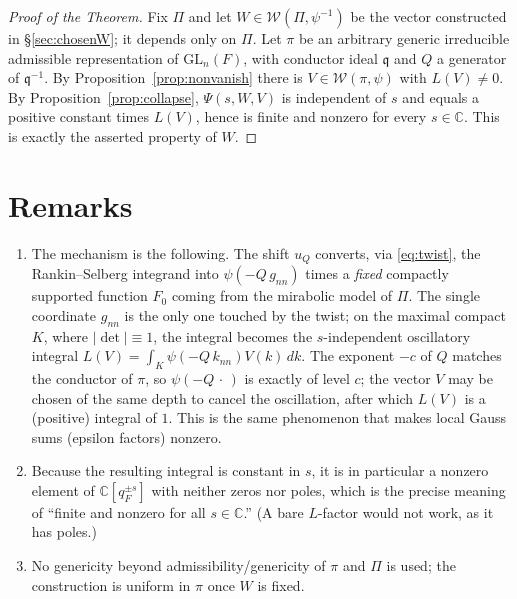 \documentclass[12pt]{article}
\newcommand{\GL}{\mathrm{GL}}
\newcommand{\qq}{\mathfrak{q}}
\newcommand{\Wmod}{\mathcal{W}}
\begin{document}
\begin{proof}[Proof of the Theorem]
Fix $\Pi$ and let $W\in\Wmod(\Pi,\psi^{-1})$ be the vector constructed in
\S\ref{sec:chosenW}; it depends only on $\Pi$. Let $\pi$ be an arbitrary generic
irreducible admissible representation of $\GL_n(F)$, with conductor ideal $\qq$ and
$Q$ a generator of $\qq^{-1}$. By Proposition~\ref{prop:nonvanish} there is
$V\in\Wmod(\pi,\psi)$ with $L(V)\neq0$. By Proposition~\ref{prop:collapse},
$\Psi(s,W,V)$ is independent of $s$ and equals a positive constant times $L(V)$,
hence is finite and nonzero for every $s\in\mathbb C$. This is exactly the asserted
property of $W$.
\end{proof}

\section*{Remarks}

\begin{enumerate}
\item The mechanism is the following. The shift $u_Q$ converts, via
\eqref{eq:twist}, the Rankin--Selberg integrand into $\psi(-Q\,g_{nn})$ times a
\emph{fixed} compactly supported function $F_0$ coming from the mirabolic model of
$\Pi$. The single coordinate $g_{nn}$ is the only one touched by the twist; on the
maximal compact $K$, where $|\det|\equiv1$, the integral becomes the $s$-independent
oscillatory integral $L(V)=\int_K\psi(-Q\,k_{nn})V(k)\,dk$. The exponent $-c$ of $Q$
matches the conductor of $\pi$, so $\psi(-Q\,\cdot\,)$ is exactly of level $c$; the
vector $V$ may be chosen of the same depth to cancel the oscillation, after which
$L(V)$ is a (positive) integral of $1$. This is the same phenomenon that makes
local Gauss sums (epsilon factors) nonzero.

\item Because the resulting integral is constant in $s$, it is in particular a
nonzero element of $\mathbb C[q_F^{\pm s}]$ with neither zeros nor poles, which is
the precise meaning of ``finite and nonzero for all $s\in\mathbb C$.'' (A bare
$L$-factor would not work, as it has poles.)

\item No genericity beyond admissibility/genericity of $\pi$ and $\Pi$ is used; the
construction is uniform in $\pi$ once $W$ is fixed.
\end{enumerate}
\end{document}
